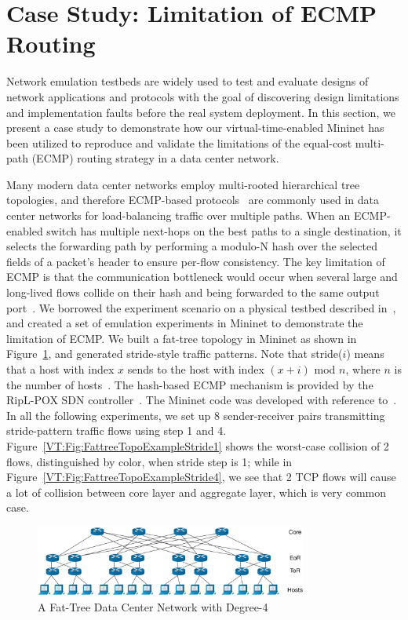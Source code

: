 \section{Case Study: Limitation of ECMP Routing}
\label{VT:Sec:CaseStudy}
Network emulation testbeds are widely used to test and evaluate designs of network applications and
protocols with the goal of discovering design limitations and implementation faults before the real system deployment.
In this section, we present a case study to demonstrate how our virtual-time-enabled Mininet has been utilized to
reproduce and validate the limitations of the equal-cost multi-path (ECMP) routing strategy in a data center network.

Many modern data center networks employ multi-rooted hierarchical tree topologies,
and therefore ECMP-based protocols~\cite{ECMP} are commonly used in data center networks for load-balancing traffic over multiple paths.
When an ECMP-enabled switch has multiple next-hops on the best paths to a single destination,
it selects the forwarding path by performing a modulo-N hash over the selected fields of a packet's header to ensure per-flow consistency.
The key limitation of ECMP is that the communication bottleneck would occur when several large and
long-lived flows collide on their hash and being forwarded to the same output port~\cite{Hedera}. 
We borrowed the experiment scenario on a physical testbed described in~\cite{Hedera},
and created a set of emulation experiments in Mininet to demonstrate the limitation of ECMP.
We built a fat-tree topology in Mininet as shown in Figure~\ref{VT:Fig:FattreeTopoExample},
and generated stride-style traffic patterns. Note that stride($i$) means that a host with index $x$ sends to the host with index $(x + i)$ mod $n$,
where $n$ is the number of hosts~\cite{Hedera}. 
The hash-based ECMP mechanism is provided by the RipL-POX SDN controller~\cite{RipLPox}.
The Mininet code was developed with reference to~\cite{ReproNetReserch}.
In all the following experiments, we set up 8 sender-receiver pairs transmitting stride-pattern traffic flows using step 1 and 4.
Figure~\ref{VT:Fig:FattreeTopoExampleStride1} shows the worst-case collision of 2 flows, distinguished by color, when stride step is 1;
while in Figure~\ref{VT:Fig:FattreeTopoExampleStride4}, we see that 2 TCP flows will cause a lot of collision between core layer and aggregate layer,
which is very common case.

\begin{figure}[ht]
    \centering
    \includegraphics[width=0.8\textwidth]{VirtualTime/figures/TopoFatTreeExample.eps}
    \caption{A Fat-Tree Data Center Network with Degree-4}
    \label{VT:Fig:FattreeTopoExample}
\end{figure}


